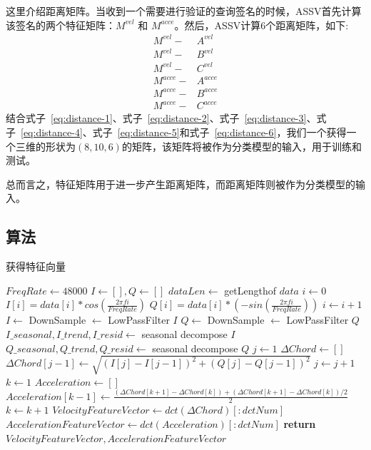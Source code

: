这里介绍距离矩阵。当收到一个需要进行验证的查询签名的时候，ASSV首先计算该签名的两个特征矩阵：$M^{vel}$ 和 $M^{acce}$。然后，ASSV计算6个距离矩阵，如下:
\begin{align}
M^{vel} -& A^{vel}  \label{eq:distance-1} \\
M^{vel} -& B^{vel}  \label{eq:distance-2} \\
M^{vel} -& C^{vel}  \label{eq:distance-3} \\
M^{acce} -& A^{acce} \label{eq:distance-4} \\
M^{acce} -& B^{acce} \label{eq:distance-5} \\
M^{acce} -& C^{acce} \label{eq:distance-6}
\end{align}
结合式子~\ref{eq:distance-1}、式子~\ref{eq:distance-2}、式子~\ref{eq:distance-3}、式子~\ref{eq:distance-4}、式子~\ref{eq:distance-5}和式子~\ref{eq:distance-6}，我们一个获得一个三维的形状为$(8,10,6)$的矩阵，该矩阵将被作为分类模型的输入，用于训练和测试。

总而言之，特征矩阵用于进一步产生距离矩阵，而距离矩阵则被作为分类模型的输入。

\subsection{算法}

\begin{algorithm}
\caption{获得特征向量}
\label{alg:get-feature-vector}
\begin{algorithmic}[1]
\State $FreqRate \gets 48000$           
\State $I \gets [], Q \gets []$  
\State $dataLen \gets$ getLengthof $data$  
\State $i \gets 0$
 
\State $I[i]=data[i]*cos(\frac{2\pi fi}{FreqRate})$
\State $Q[i]=data[i]*(-sin(\frac{2\pi fi}{FreqRate}))$
\State $i \gets i + 1$
\EndWhile\label{euclidendwhile}
\State $I \gets $ DownSample $\gets $ LowPassFilter $I$   
\State $Q \gets $ DownSample $\gets $ LowPassFilter $Q$   
\State $I\_seasonal,I\_trend,I\_resid \gets$ seasonal decompose $I$      
\State $Q\_seasonal,Q\_trend,Q\_resid \gets$ seasonal decompose $Q$  
\State $j \gets 1$
\State $\Delta Chord \gets []$
 
\State $\Delta Chord[j-1] \gets \sqrt{(I[j]-I[j-1])^{2} + (Q[j]-Q[j-1])^{2}}$
\State $j \gets j + 1$
\EndWhile\label{euclidendwhile}
\State $k \gets 1$
\State $Acceleration \gets []$
 
\State $Acceleration[k-1] \gets \frac{(\Delta Chord[k+1] - \Delta Chord[k]) + (\Delta Chord[k+1] - \Delta Chord[k])/2}{2}$
\State $k \gets k + 1$
\EndWhile\label{euclidendwhile}
\State $VelocityFeatureVector \gets dct(\Delta Chord)[:dctNum]$
\State $AccelerationFeatureVector \gets dct(Acceleration)[:dctNum]$
\State \textbf{return} $VelocityFeatureVector,AccelerationFeatureVector$
\EndProcedure
\end{algorithmic}
\end{algorithm}

